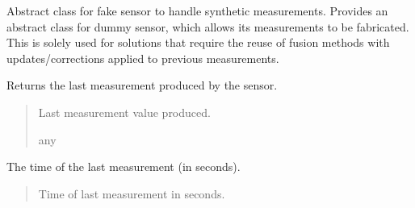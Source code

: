 \documentclass[letterpaper,10pt,english]{sphinxmanual}
\begin{document}
\begin{fulllineitems}
\label{\detokenize{modules/quantum/dummy:qnav.quantum.dummy.DummySensor}}
\pysigstartsignatures
{}
\pysigstopsignatures
\sphinxAtStartPar
Abstract class for fake sensor to handle synthetic measurements.
Provides an abstract class for dummy sensor, which allows its
measurements to be fabricated. This is solely used for solutions
that require the re\sphinxhyphen{}use of fusion methods with updates/corrections
applied to previous measurements.

\begin{fulllineitems}
\label{\detokenize{modules/quantum/dummy:qnav.quantum.dummy.DummySensor.last_measurement}}
\pysigstartsignatures
{}
\pysigstopsignatures
\sphinxAtStartPar
Returns the last measurement produced by the sensor.
\begin{quote}\begin{description}
\sphinxAtStartPar
Last measurement value produced.

\sphinxAtStartPar
any

\end{description}\end{quote}

\end{fulllineitems}


\begin{fulllineitems}
\label{\detokenize{modules/quantum/dummy:qnav.quantum.dummy.DummySensor.last_update}}
\pysigstartsignatures
{}
\pysigstopsignatures
\sphinxAtStartPar
The time of the last measurement (in seconds).
\begin{quote}\begin{description}
\sphinxAtStartPar
Time of last measurement in seconds.


\end{description}
\end{quote}
\end{fulllineitems}
\end{fulllineitems}
\end{document}
